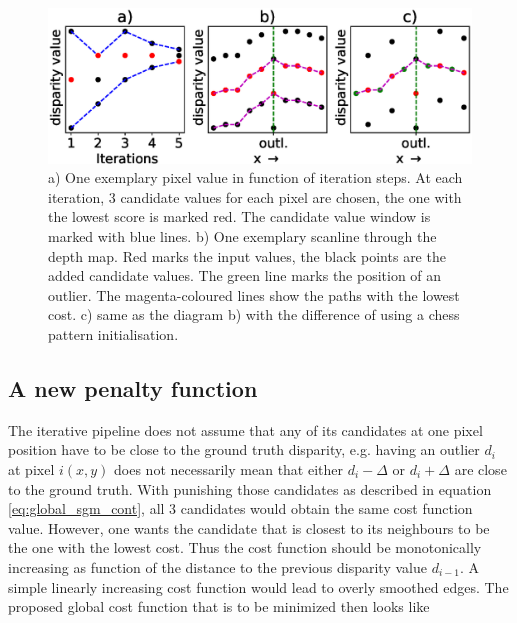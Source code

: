\documentclass  [
  paper    = a4,
  BCOR     = 10mm,
  twoside,
  fontsize = 12pt,
  fleqn,
  toc      = bibnumbered,
  toc      = listofnumbered,
  numbers  = noendperiod,
  headings = normal,
  listof   = leveldown,
  version  = 3.03
]                                       {scrreprt}
\begin{document}
\begin{figure}[h!]
	\centering
	\includegraphics[width=1\linewidth]{images/iteration_steps}
	\caption[Iterative SGM: Convergence]{a) One exemplary pixel value in function of iteration steps. At each iteration, 3 candidate values for each pixel are chosen, the one with the lowest score is marked red. The candidate value window is marked with blue lines. b) One exemplary scanline through the depth map. Red marks the input values, the black points are the added candidate values. The green line marks the position of an outlier. The magenta-coloured lines show the paths with the lowest cost. c) same as the diagram b) with the difference of using a chess pattern initialisation. }
	\label{fig:iterationsteps}
\end{figure}

\subsection{A new penalty function} 
The iterative pipeline does not assume that any of its candidates at one pixel position have to be close to the ground truth disparity, e.g. having an outlier $d_i$ at pixel $i(x,y)$ does not necessarily mean that either $d_i-\Delta$ or $d_i+\Delta$ are close to the ground truth. With punishing those candidates as described in equation \ref{eq:global_sgm_cont}, all 3 candidates would obtain the same cost function value. However, one wants the candidate that is closest to its neighbours to be the one with the lowest cost. Thus the cost function should be monotonically increasing as function of the distance to the previous disparity value $d_{i-1}$. A simple linearly increasing cost function would lead to overly smoothed edges. The proposed global cost function that is to be minimized then looks like
\end{document}
